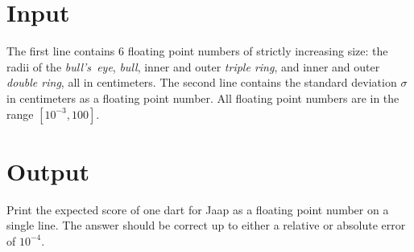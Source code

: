 \section*{Input}

The first line contains 6 floating point
numbers of strictly increasing size: the radii of the
\emph{bull's~eye}, \emph{bull}, inner and outer \emph{triple ring},
and inner and outer \emph{double ring}, all in centimeters. The second
line contains the standard deviation $\sigma$ in centimeters as a
floating point number. All floating point numbers are in the range
$[10^{-3}, 100]$.

\section*{Output}

Print the expected score of one dart for Jaap as a floating point
number on a single line. The answer should be correct up to either a
relative or absolute error of $10^{-4}$.


